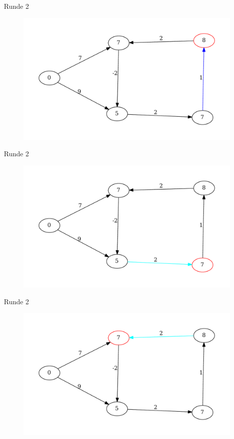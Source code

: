 \begin{frame}{Runde 2}
\begin{figure}[htbp]
\centering
\includegraphics[width=\linewidth]{bellman_ford_graphs/graph_11.pdf}
\end{figure}
\end{frame}

\begin{frame}{Runde 2}
\begin{figure}[htbp]
\centering
\includegraphics[width=\linewidth]{bellman_ford_graphs/graph_12.pdf}
\end{figure}
\end{frame}

\begin{frame}{Runde 2}
\begin{figure}[htbp]
\centering
\includegraphics[width=\linewidth]{bellman_ford_graphs/graph_13.pdf}
\end{figure}
\end{frame}

